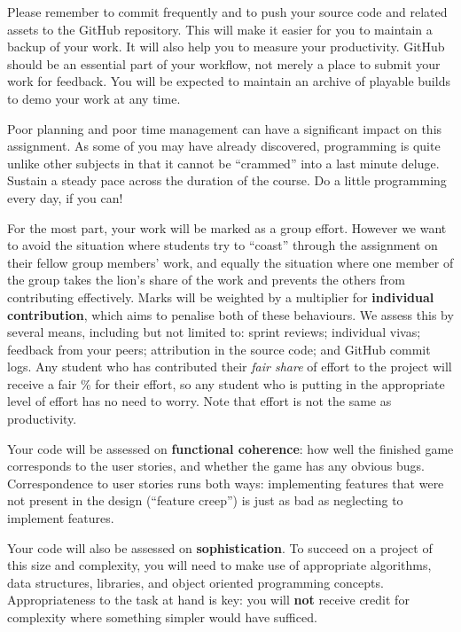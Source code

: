 \documentclass{../../fal_assignment}
\begin{document}
Please remember to commit frequently and to push your source code and related assets to the GitHub repository. This will make it easier for you to maintain a backup of your work. It will also help you to measure your productivity. GitHub should be an essential part of your workflow, not merely a place to submit your work for feedback. You will be expected to maintain an archive of playable builds to demo your work at any time.

Poor planning and poor time management can have a significant impact on this assignment. As some of you may have already discovered, programming is quite unlike other subjects in that it cannot be ``crammed'' into a last minute deluge. Sustain a steady pace across the duration of the course. Do a little programming every day, if you can!

For the most part, your work will be marked as a group effort.
However we want to avoid the situation where students try to ``coast'' through the assignment
on their fellow group members' work,
and equally the situation where one member of the group takes the lion's share of the work
and prevents the others from contributing effectively.
Marks will be weighted by a multiplier for \textbf{individual contribution},
which aims to penalise both of these behaviours.
We assess this by several means, including but not limited to: sprint reviews; individual vivas; feedback from your peers;
attribution in the source code; and GitHub commit logs.
Any student who has contributed their \textit{fair share} of effort to the project will receive a fair \% for their effort,
so any student who is putting in the appropriate level of effort has no need to worry.
Note that effort is not the same as productivity.

Your code will be assessed on \textbf{functional coherence}:
how well the finished game corresponds to the user stories,
and whether the game has any obvious bugs.
Correspondence to user stories runs both ways:
implementing features that were not present in the design (``feature creep'')
is just as bad as neglecting to implement features.

Your code will also be assessed on \textbf{sophistication}.
To succeed on a project of this size and complexity,
you will need to make use of appropriate algorithms, data structures, libraries, and object oriented programming concepts.
Appropriateness to the task at hand is key:
you will \textbf{not} receive credit for complexity  
where something simpler would have sufficed.
\end{document}
